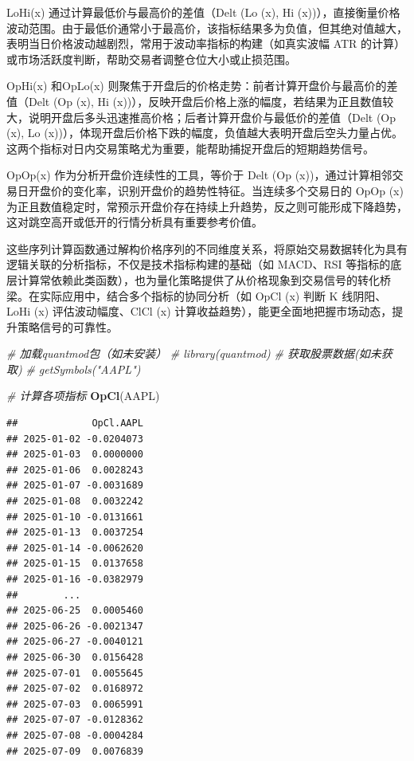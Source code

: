 \documentclass[]{ctexbook}
\newenvironment{Shaded}{\begin{snugshade}}{\end{snugshade}}
\newcommand{\CommentTok}[1]{\textcolor[rgb]{0.56,0.35,0.01}{\textit{#1}}}
\newcommand{\FunctionTok}[1]{\textcolor[rgb]{0.13,0.29,0.53}{\textbf{#1}}}
\newcommand{\NormalTok}[1]{#1}
\begin{document}
LoHi(x) 通过计算最低价与最高价的差值（Delt (Lo (x), Hi (x))），直接衡量价格波动范围。由于最低价通常小于最高价，该指标结果多为负值，但其绝对值越大，表明当日价格波动越剧烈，常用于波动率指标的构建（如真实波幅 ATR 的计算）或市场活跃度判断，帮助交易者调整仓位大小或止损范围。

OpHi(x) 和OpLo(x) 则聚焦于开盘后的价格走势：前者计算开盘价与最高价的差值（Delt (Op (x), Hi (x))），反映开盘后价格上涨的幅度，若结果为正且数值较大，说明开盘后多头迅速推高价格；后者计算开盘价与最低价的差值（Delt (Op (x), Lo (x))），体现开盘后价格下跌的幅度，负值越大表明开盘后空头力量占优。这两个指标对日内交易策略尤为重要，能帮助捕捉开盘后的短期趋势信号。

OpOp(x) 作为分析开盘价连续性的工具，等价于 Delt (Op (x))，通过计算相邻交易日开盘价的变化率，识别开盘价的趋势性特征。当连续多个交易日的 OpOp (x) 为正且数值稳定时，常预示开盘价存在持续上升趋势，反之则可能形成下降趋势，这对跳空高开或低开的行情分析具有重要参考价值。

这些序列计算函数通过解构价格序列的不同维度关系，将原始交易数据转化为具有逻辑关联的分析指标，不仅是技术指标构建的基础（如 MACD、RSI 等指标的底层计算常依赖此类函数），也为量化策略提供了从价格现象到交易信号的转化桥梁。在实际应用中，结合多个指标的协同分析（如 OpCl (x) 判断 K 线阴阳、LoHi (x) 评估波动幅度、ClCl (x) 计算收益趋势），能更全面地把握市场动态，提升策略信号的可靠性。

\begin{Shaded}
\begin{Highlighting}[]
\CommentTok{\# 加载quantmod包（如未安装）}
\CommentTok{\# library(quantmod)}
\CommentTok{\# 获取股票数据(如未获取)}
\CommentTok{\# getSymbols("AAPL")}

\CommentTok{\# 计算各项指标}
\FunctionTok{OpCl}\NormalTok{(AAPL)}
\end{Highlighting}
\end{Shaded}

\begin{verbatim}
##             OpCl.AAPL
## 2025-01-02 -0.0204073
## 2025-01-03  0.0000000
## 2025-01-06  0.0028243
## 2025-01-07 -0.0031689
## 2025-01-08  0.0032242
## 2025-01-10 -0.0131661
## 2025-01-13  0.0037254
## 2025-01-14 -0.0062620
## 2025-01-15  0.0137658
## 2025-01-16 -0.0382979
##        ...           
## 2025-06-25  0.0005460
## 2025-06-26 -0.0021347
## 2025-06-27 -0.0040121
## 2025-06-30  0.0156428
## 2025-07-01  0.0055645
## 2025-07-02  0.0168972
## 2025-07-03  0.0065991
## 2025-07-07 -0.0128362
## 2025-07-08 -0.0004284
## 2025-07-09  0.0076839
\end{verbatim}
\end{document}
